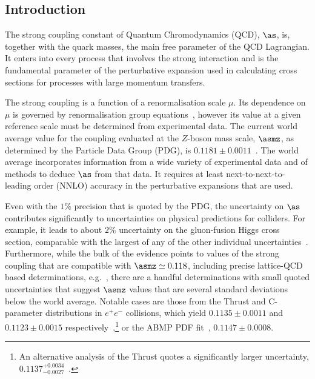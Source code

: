 \subsection{Introduction}

The strong coupling constant of Quantum Chromodynamics (QCD), $\as$,
is, together with the quark masses, the main free parameter of the QCD
Lagrangian. 
%
It enters into every process that involves the strong interaction and
is the fundamental parameter of the perturbative expansion used in
calculating cross sections for processes with large momentum
transfers.

The strong coupling is a function of a renormalisation scale $\mu$.
%
Its dependence on $\mu$ is governed by renormalisation group
equations~\cite{Baikov:2016tgj,Herzog:2017ohr}, however its value at a given reference
scale must be determined from experimental data.
%
The current world average value for the coupling evaluated at the
$Z$-boson mass scale, $\asmz$, as determined by the Particle Data
Group (PDG), is $0.1181 \pm 0.0011$~\cite{pdg}.
%
The world average incorporates information from a wide variety of
experimental data and of methods to deduce $\as$ from that data.
%
It requires at least next-to-next-to-leading order (NNLO) accuracy in
the perturbative expansions that are used.

Even with the $1\%$ precision that is quoted by the PDG, the
uncertainty on $\as$ contributes significantly to uncertainties on
physical predictions for colliders.
%
For example, it leads to about $2\%$ uncertainty on the gluon-fusion
Higgs cross section, comparable with the largest of any of the other
individual uncertainties~\cite{Anastasiou:2016cez}.
% 
Furthermore, while the bulk of the evidence points to values of the
strong coupling that are compatible with $\asmz \simeq 0.118$,
including precise lattice-QCD based
determinations, e.g.~\cite{pdg,Aoki:2016frl,McNeile:2010ji,Bruno:2017gxd},
%
there are a handful determinations with small quoted uncertainties
that suggest $\asmz$ values that are several standard deviations below
the world average. 
%
Notable cases are those from the
Thrust and C-parameter distributions in $e^+e^-$ collisions, which
yield $0.1135 \pm 0.0011$ and $0.1123 \pm 0.0015$
respectively~\cite{Abbate:2010xh,Hoang:2015hka},\footnote{ An
  alternative analysis of the Thrust quotes a significantly larger
  uncertainty, $0.1137^{+0.0034}_{-0.0027}$~\cite{Gehrmann:2012sc}.}
%
or the ABMP PDF fit~\cite{Alekhin:2017kpj}, $0.1147\pm0.0008$.

